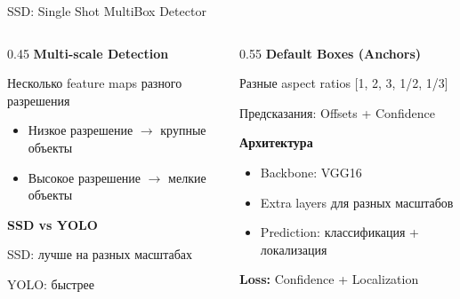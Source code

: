 \documentclass[aspectratio=169, 9pt]{beamer}
\begin{document}
\begin{frame}{SSD: Single Shot MultiBox Detector}
\begin{columns}[T]
\begin{column}{0.45\textwidth}
{\bfseries\textcolor{blue!70}{Multi-scale Detection}}

{\small Несколько feature maps разного разрешения}

{\small
\begin{itemize}
    \item Низкое разрешение $\to$ крупные объекты
    \item Высокое разрешение $\to$ мелкие объекты
\end{itemize}
}

\vspace{0.3em}
{\bfseries\textcolor{green!50!black}{SSD vs YOLO}}

{\small SSD: лучше на разных масштабах}

{\small YOLO: быстрее}
\end{column}

\begin{column}{0.55\textwidth}
{\bfseries\textcolor{blue!70}{Default Boxes (Anchors)}}

{\small Разные aspect ratios [1, 2, 3, 1/2, 1/3]}

{\small Предсказания: Offsets + Confidence}

\vspace{0.3em}
{\bfseries\textcolor{green!50!black}{Архитектура}}

{\small
\begin{itemize}
    \item Backbone: VGG16
    \item Extra layers для разных масштабов
    \item Prediction: классификация + локализация
\end{itemize}
}

\vspace{0.3em}
{\bfseries\textcolor{blue!70}{Loss:}} Confidence + Localization
\end{column}
\end{columns}
\end{frame}
\end{document}
